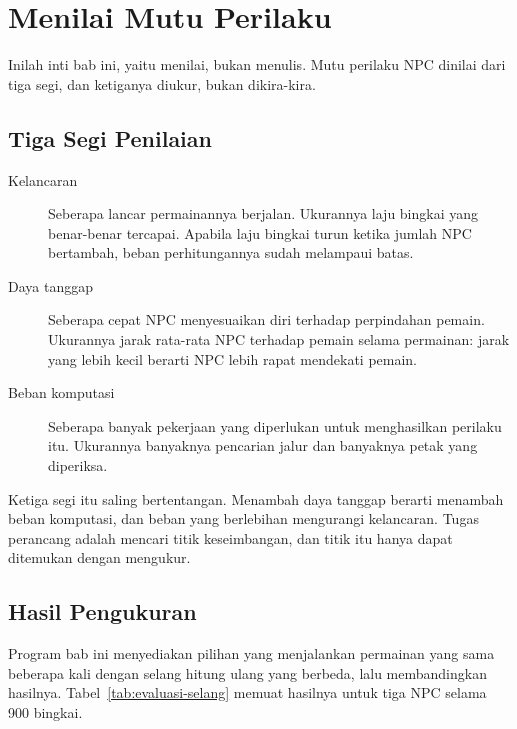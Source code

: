 \section{Menilai Mutu Perilaku}
\label{sec:menilai-mutu}

Inilah inti bab ini, yaitu menilai, bukan menulis. Mutu perilaku NPC dinilai
dari tiga segi, dan ketiganya diukur, bukan dikira-kira.

\subsection{Tiga Segi Penilaian}

\begin{description}
  \item[Kelancaran] Seberapa lancar permainannya berjalan. Ukurannya laju
        bingkai yang benar-benar tercapai. Apabila laju bingkai turun ketika
        jumlah NPC bertambah, beban perhitungannya sudah melampaui batas.
  \item[Daya tanggap] Seberapa cepat NPC menyesuaikan diri terhadap perpindahan
        pemain. Ukurannya jarak rata-rata NPC terhadap pemain selama permainan:
        jarak yang lebih kecil berarti NPC lebih rapat mendekati pemain.
  \item[Beban komputasi] Seberapa banyak pekerjaan yang diperlukan untuk
        menghasilkan perilaku itu. Ukurannya banyaknya pencarian jalur dan
        banyaknya petak yang diperiksa.
\end{description}

Ketiga segi itu saling bertentangan. Menambah daya tanggap berarti menambah
beban komputasi, dan beban yang berlebihan mengurangi kelancaran. Tugas
perancang adalah mencari titik keseimbangan, dan titik itu hanya dapat
ditemukan dengan mengukur.

\subsection{Hasil Pengukuran}

Program bab ini menyediakan pilihan  yang menjalankan
permainan yang sama beberapa kali dengan selang hitung ulang yang berbeda, lalu
membandingkan hasilnya. Tabel~\ref{tab:evaluasi-selang} memuat hasilnya untuk
tiga NPC selama 900 bingkai.

